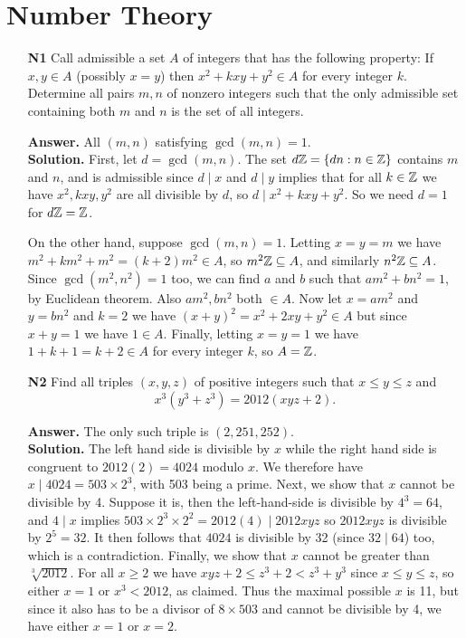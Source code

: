 \documentclass[11pt,a4paper]{article}
\begin{document}
\section*{Number Theory}
\begin{enumerate}
	\item [\textbf{N1}] Call admissible a set $A$ of integers that has the following property:
	If $x,y \in A$ (possibly $x=y$) then $x^2+kxy+y^2 \in A$ for every integer $k$.
	Determine all pairs $m,n$ of nonzero integers such that the only admissible set containing both $m$ and $n$ is the set of all integers.
	
	\textbf{Answer.} All $(m, n)$ satisfying $\gcd(m, n)=1$. \\
	\textbf{Solution.} First, let $d=\gcd(m, n)$. The set $d\mathbb{Z}=\{dn: n\in\mathbb{Z}\}$ contains $m$ and $n$, and is admissible since $d\mid x$ and $d\mid y$ implies that for all $k\in\mathbb{Z}$ we have $x^2, kxy, y^2$ are all divisible by $d$, so $d\mid x^2+kxy+y^2$. 
	So we need $d=1$ for $d\mathbb{Z}=\mathbb{Z}$. 
	
	On the other hand, suppose $\gcd(m, n)=1$. Letting $x=y=m$ we have $m^2+km^2+m^2=(k+2)m^2\in A$, so $m^2\mathbb{Z}\subseteq A$, and similarly $n^2\mathbb{Z}\subseteq A$. Since $\gcd(m^2, n^2)=1$ too, we can find $a$ and $b$ such that $am^2+bn^2=1$, by Euclidean theorem. Also $am^2, bn^2$ both $\in A$. 
	Now let $x=am^2$ and $y=bn^2$ and $k=2$ we have $(x+y)^2=x^2+2xy+y^2\in A$ but since $x+y=1$ we have $1\in A$. Finally, letting $x=y=1$ we have $1+k+1=k+2\in A$ for every integer $k$, so $A=\mathbb{Z}$. 
	
	\item[\textbf{N2}] Find all triples $(x,y,z)$ of positive integers such that $x \leq y \leq z$ and
	\[x^3(y^3+z^3)=2012(xyz+2).\]
	
	\textbf{Answer.} The only such triple is $(2, 251, 252)$. \\
	\textbf{Solution.} The left hand side is divisible by $x$ while the right hand side is congruent to $2012(2)=4024$ modulo $x$. We therefore have $x\mid 4024=503\times 2^3$, with 503 being a prime. 
	Next, we show that $x$ cannot be divisible by 4. Suppose it is, then the left-hand-side is divisible by $4^3=64$, and $4\mid x$ implies $503\times 2^3\times 2^2=2012(4)\mid 2012xyz$ so $2012xyz$ is divisible by $2^5=32$. It then follows that $4024$ is divisible by 32 (since $32\mid 64$) too, which is a contradiction. 
	Finally, we show that $x$ cannot be greater than $\sqrt[3]{2012}$. 
	For all $x\ge 2$ we have $xyz+2\le z^3+2<z^3+y^3$ since $x\le y\le z$, so either $x=1$ or $x^3<2012$, as claimed. 
	Thus the maximal possible $x$ is 11, but since it also has to be a divisor of $8\times 503$ and cannot be divisible by 4, we have either $x=1$ or $x=2$. 
	

\end{enumerate}
\end{document}
